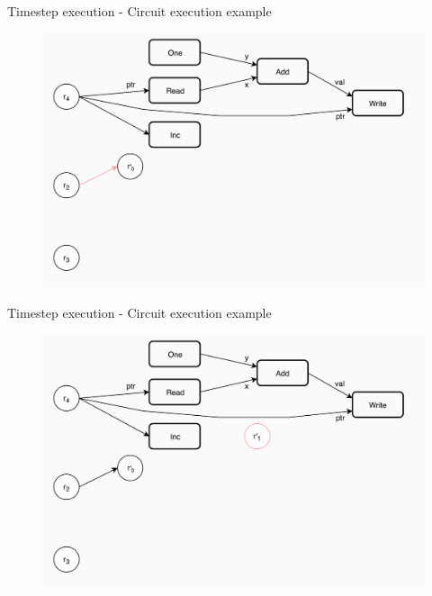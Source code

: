 \documentclass[xcolor={usenames}]{beamer}
\begin{document}
  \begin{frame}{Timestep execution - Circuit execution example}
  	\begin{figure}
  		\centering
  		\includegraphics[width=\textwidth]{../figures/example-circuit-13.png}
  	\end{figure}
  \end{frame}
  \begin{frame}{Timestep execution - Circuit execution example}
  	\begin{figure}
  		\centering
  		\includegraphics[width=\textwidth]{../figures/example-circuit-14.png}
  	\end{figure}
  \end{frame}
\end{document}
